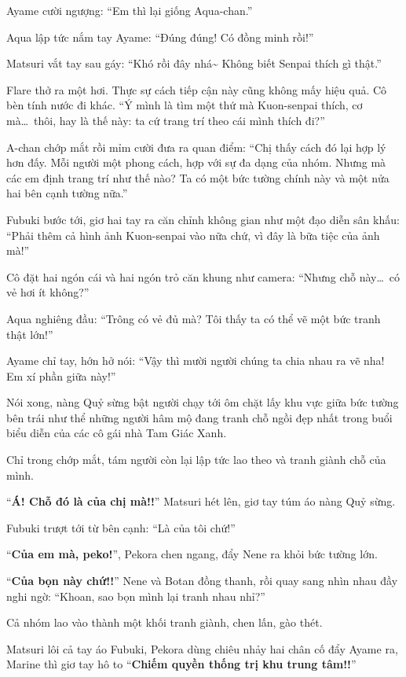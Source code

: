 \documentclass[../main.tex]{subfiles}
\begin{document}
Ayame cười ngượng: ``Em thì lại giống Aqua-chan.''

Aqua lập tức nắm tay Ayame: ``Đúng đúng! Có đồng minh rồi!''

Matsuri vắt tay sau gáy: ``Khó rồi đây nhá\~{} Không biết Senpai thích gì thật.''

Flare thở ra một hơi. Thực sự cách tiếp cận này cũng không mấy hiệu quả. Cô bèn tính nước đi khác. ``Ý mình là tìm một thứ mà Kuon-senpai thích, cơ mà\dots\ thôi, hay là thế này: ta cứ trang trí theo cái mình thích đi?''

A-chan chớp mắt rồi mỉm cười đưa ra quan điểm: ``Chị thấy cách đó lại hợp lý hơn đấy. Mỗi người một phong cách, hợp với sự đa dạng của nhóm. Nhưng mà các em định trang trí như thế nào? Ta có một bức tường chính này và một nửa hai bên cạnh tường nữa.''

Fubuki bước tới, giơ hai tay ra căn chỉnh không gian như một đạo diễn sân khấu: ``Phải thêm cả hình ảnh Kuon-senpai vào nữa chứ, vì đây là bữa tiệc của ảnh mà!''

Cô đặt hai ngón cái và hai ngón trỏ căn khung như camera: ``Nhưng chỗ này\dots\ có vẻ hơi ít không?''

Aqua nghiêng đầu: ``Trông có vẻ đủ mà? Tôi thấy ta có thể vẽ một bức tranh thật lớn!''

Ayame chỉ tay, hớn hở nói: ``Vậy thì mười người chúng ta chia nhau ra vẽ nha! Em xí phần giữa này!''

Nói xong, nàng Quỷ sừng bật người chạy tới ôm chặt lấy khu vực giữa bức tường bên trái như thể những người hâm mộ đang tranh chỗ ngồi đẹp nhất trong buổi biểu diễn của các cô gái nhà Tam Giác Xanh.

Chỉ trong chớp mắt, tám người còn lại lập tức lao theo và tranh giành chỗ của mình.

``\textbf{Á! Chỗ đó là của chị mà!!}'' Matsuri hét lên, giơ tay túm áo nàng Quỷ sừng.

Fubuki trượt tới từ bên cạnh: ``Là của tôi chứ!''

``\textbf{Của em mà, peko!}'', Pekora chen ngang, đẩy Nene ra khỏi bức tường lớn.

``\textbf{Của bọn này chứ!!}'' Nene và Botan đồng thanh, rồi quay sang nhìn nhau đầy nghi ngờ: ``Khoan, sao bọn mình lại tranh nhau nhỉ?''

Cả nhóm lao vào thành một khối tranh giành, chen lấn, gào thét.

Matsuri lôi cả tay áo Fubuki, Pekora dùng chiêu nhảy hai chân cố đẩy Ayame ra, Marine thì giơ tay hô to ``\textbf{Chiếm quyền thống trị khu trung tâm!!}''
\end{document}
